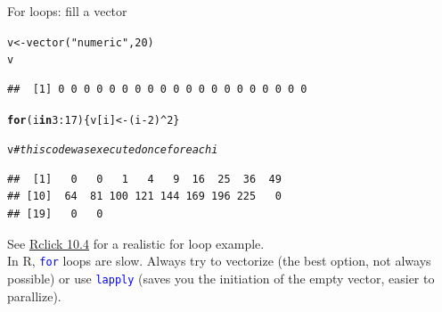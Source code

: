 \documentclass[xcolor=table,           xcolor=dvipsnames]{beamer}\usepackage[]{graphicx}\usepackage[]{color}
\makeatletter
\newcommand{\hlnum}[1]{\textcolor[rgb]{0,0,0}{#1}}
\newcommand{\hlstr}[1]{\textcolor[rgb]{0.545,0.137,0.137}{#1}}
\newcommand{\hlcom}[1]{\textcolor[rgb]{0,0.392,0}{\textit{#1}}}
\newcommand{\hlopt}[1]{\textcolor[rgb]{0,0,0}{#1}}
\newcommand{\hlstd}[1]{\textcolor[rgb]{0,0,0}{#1}}
\newcommand{\hlkwa}[1]{\textcolor[rgb]{1,0,0}{\textbf{#1}}}
\newcommand{\hlkwb}[1]{\textcolor[rgb]{0,0,0}{#1}}
\newcommand{\hlkwd}[1]{\textcolor[rgb]{0,0,1}{#1}}
\newenvironment{kframe}{%
 \def\at@end@of@kframe{}%
 \ifinner\ifhmode%
  \def\at@end@of@kframe{\end{minipage}}%
  \begin{minipage}{\columnwidth}%
 \fi\fi%
 \def\FrameCommand##1{\hskip\@totalleftmargin \hskip-\fboxsep
 \colorbox{shadecolor}{##1}\hskip-\fboxsep
     \hskip-\linewidth \hskip-\@totalleftmargin \hskip\columnwidth}%
 \MakeFramed {\advance\hsize-\width
   \@totalleftmargin\z@ \linewidth\hsize
   \@setminipage}}%
 {\par\unskip\endMakeFramed%
 \at@end@of@kframe}
\newenvironment{knitrout}{}{} %
\newcommand{\rcode}[1]{\texttt{\textcolor{Blue}{#1}}} %
\makeatother
\begin{document}

\begin{frame}[fragile]{For loops: fill a vector}
\begin{knitrout}
\color{fgcolor}\begin{kframe}
\begin{alltt}
\hlstd{v} \hlkwb{<-} \hlkwd{vector}\hlstd{(}\hlstr{"numeric"}\hlstd{,} \hlnum{20}\hlstd{)}
\hlstd{v}
\end{alltt}
\begin{verbatim}
##  [1] 0 0 0 0 0 0 0 0 0 0 0 0 0 0 0 0 0 0 0 0
\end{verbatim}
\end{kframe}
\end{knitrout}
\pause \vspace{-1em}
\begin{knitrout}
\color{fgcolor}\begin{kframe}
\begin{alltt}
\hlkwa{for}\hlstd{(i} \hlkwa{in} \hlnum{3}\hlopt{:}\hlnum{17}\hlstd{)  \{  v[i]} \hlkwb{<-} \hlstd{(i}\hlopt{-}\hlnum{2}\hlstd{)}\hlopt{^}\hlnum{2}  \hlstd{\}}
\end{alltt}
\end{kframe}
\end{knitrout}
\pause \vspace{-1em}
\begin{knitrout}
\color{fgcolor}\begin{kframe}
\begin{alltt}
\hlstd{v} \hlcom{# this code was executed once for each i}
\end{alltt}
\begin{verbatim}
##  [1]   0   0   1   4   9  16  25  36  49
## [10]  64  81 100 121 144 169 196 225   0
## [19]   0   0
\end{verbatim}
\end{kframe}
\end{knitrout}
\pause \vspace{-0.5em}
See \href{https://rclickhandbuch.wordpress.com/hauptseite/}{Rclick 10.4} for a realistic for loop example.\\
\pause 
In R, \rcode{for} loops are slow. Always try to vectorize (the best option, not always possible) or use \rcode{lapply} (saves you the initiation of the empty vector, easier to parallize).
\end{frame}
\end{document}
